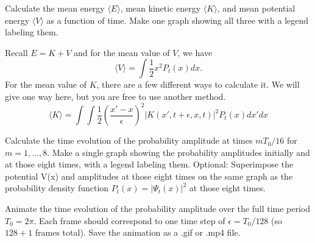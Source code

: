 \begin{solution}
\end{solution}

\begin{problem}[10]
Calculate the mean energy $\langle E \rangle$, mean kinetic energy $\langle K \rangle$, and mean potential energy $\langle V \rangle$ as a function of time.
Make one graph showing all three with a legend labeling them.

\begin{hint}
  Recall $E = K + V$ and for the mean value of $V$, we have
  \begin{equation}
    \langle V\rangle = \int \frac{1}{2}x^2 P_t(x) dx.
  \end{equation}
  For the mean value of $K$, there are a few different ways to calculate it.
  We will give one way here, but you are free to use another method.
  \begin{equation}
  \langle K\rangle = \int \int \frac{1}{2} \left(\frac{x' - x}{\epsilon}\right)^2 |K(x', t+\epsilon, x, t)|^2 P_t(x) dx' dx
  \end{equation}
  \end{hint}
\end{problem}

\begin{solution}
\end{solution}

\begin{problem}[10]
Calculate the time evolution of the probability amplitude at times $mT_0/16$ for $m=1, \dots, 8$.
Make a single graph showing the probability amplitudes initially and at those eight times, with a legend labeling them.
Optional: Superimpose the potential V(x) and  amplitudes at those eight times on the same graph as the probability density function $P_t(x) = |\Psi_t(x)|^2$ at those eight times.
\end{problem}

\begin{solution}
\end{solution}

\begin{problem}[10]
Animate the time evolution of the probability amplitude over the full time period $T_0 = 2\pi$.
Each frame should correspond to one time step of $\epsilon = T_0/128$ (so $128+1$ frames total).
Save the animation as a .gif or .mp4 file.
\end{problem}

\begin{solution}
\end{solution}


